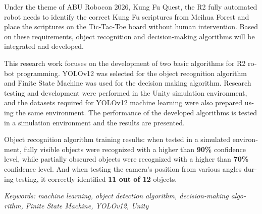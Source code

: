 \begin{english}
Under the theme of ABU Robocon 2026, Kung Fu Quest, the R2 fully automated robot needs to identify the correct Kung Fu scriptures from Meihua Forest and place the scriptures on the Tic-Tac-Toe board without human intervention. Based on these requirements, object recognition and decision-making algorithms will be integrated and developed.

This research work focuses on the development of two basic algorithms for R2 robot programming. YOLOv12 was selected for the object recognition algorithm and Finite State Machine was used for the decision making algorithm. Research testing and development were performed in the Unity simulation environment, and the datasets required for YOLOv12 machine learning were also prepared using the same environment. The performance of the developed algorithms is tested in a simulation environment and the results are presented.

Object recognition algorithm training results: when tested in a simulated environment, fully visible objects were recognized with a higher than \textbf{90\%} confidence level, while partially obscured objects were recognized with a higher than \textbf{70\%} confidence level. And when testing the camera's position from various angles during testing, it correctly identified \textbf{11 out of 12} objects.

\vspace{3mm}
\textit{Keywords: machine learning, object detection algorithm, decision-making algorithm, Finite State Machine, YOLOv12, Unity}
\end{english}
